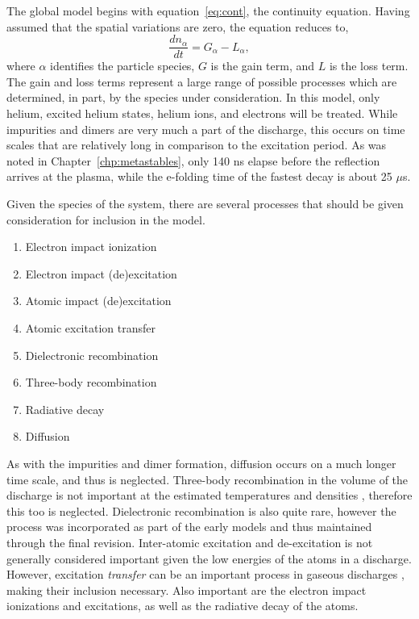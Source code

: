 The global model begins with equation~\ref{eq:cont}, the continuity equation.
Having assumed that the spatial variations are zero, the equation reduces to,
\begin{equation}
  \frac{d n_\alpha}{dt} = G_\alpha - L_\alpha,
  \label{eq:zdmcont}
\end{equation}
where $\alpha$ identifies the particle species, $G$ is the gain term, and $L$ is
the loss term. The gain and loss terms represent a large range of possible
processes which are determined, in part, by the species under consideration. In
this model, only helium, excited helium states, helium ions, and electrons will
be treated. While impurities and dimers are very much a part of the discharge,
this occurs on time scales that are relatively long in comparison to the
excitation period. As was noted in Chapter~\ref{chp:metastables}, only 140 ns
elapse before the reflection arrives at the plasma, while the e-folding time of
the fastest decay is about 25 $\mu$s.

Given the species of the system, there are several processes that should be
given consideration for inclusion in the model.
\begin{enumerate}
  \item Electron impact ionization 
  \item Electron impact (de)excitation 
  \item Atomic impact (de)excitation
  \item Atomic excitation transfer
  \item Dielectronic recombination
  \item Three-body recombination
  \item Radiative decay
  \item Diffusion
\end{enumerate}
As with the impurities and dimer formation, diffusion occurs on a much longer
time scale, and thus is neglected. Three-body recombination in the volume of the
discharge is not important at the estimated temperatures and densities
\cite{Lieberman2005}, therefore this too is neglected. Dielectronic
recombination is also quite rare, however the process was incorporated as part
of the early models and thus maintained through the final revision. Inter-atomic
excitation and de-excitation is not generally considered important given the low
energies of the atoms in a discharge. However, excitation \emph{transfer} can be
an important process in gaseous discharges \cite{Lieberman2005}, making their
inclusion necessary. Also important are the electron impact ionizations and
excitations, as well as the radiative decay of the atoms.


